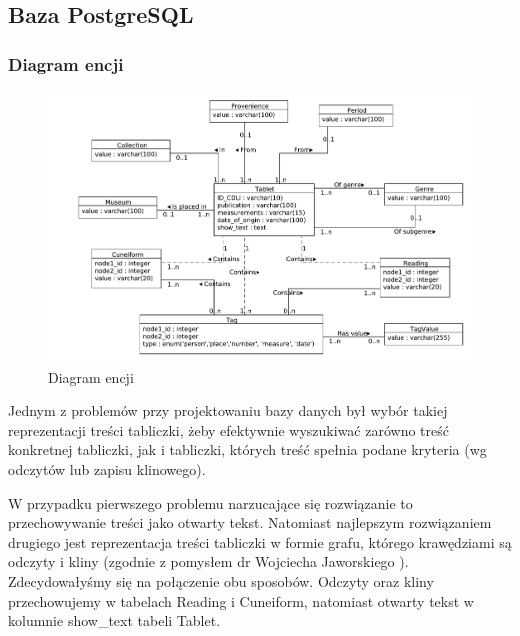 \subsection{Baza PostgreSQL}
\subsubsection{Diagram encji}
\begin{figure}[h]
\vspace{-20pt}
\hspace{-40pt}
 \includegraphics[width=500px]{../diagramy/diagram-encji-maly.pdf}
 \caption{Diagram encji}
\end{figure}
Jednym z problemów przy projektowaniu bazy danych był wybór takiej reprezentacji treści tabliczki, 
żeby efektywnie wyszukiwać zarówno treść konkretnej tabliczki, jak i tabliczki, których treść spełnia podane kryteria
 (wg odczytów lub zapisu klinowego).

W przypadku pierwszego problemu narzucające się rozwiązanie to przechowywanie treści
jako otwarty tekst.
Natomiast najlepszym rozwiązaniem drugiego jest reprezentacja treści tabliczki
w formie grafu, którego krawędziami są odczyty i kliny (zgodnie z pomysłem dr Wojciecha Jaworskiego \cite[s.374]{jaworski}).
Zdecydowałyśmy się na połączenie obu sposobów. Odczyty oraz kliny przechowujemy w tabelach Reading i Cuneiform, 
natomiast otwarty tekst w kolumnie show\_text tabeli Tablet. 

